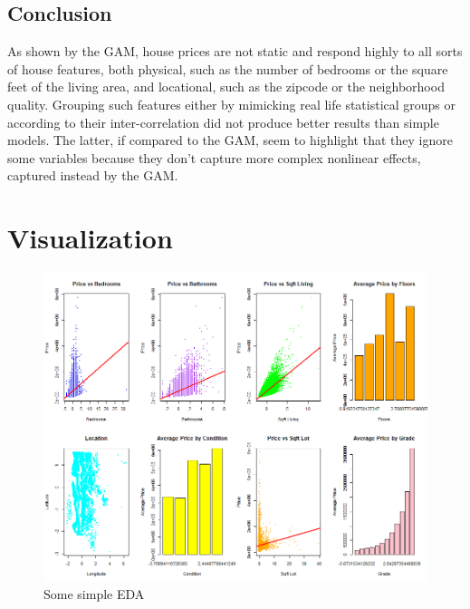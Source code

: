 \documentclass[a4paper, 11pt]{article}
\begin{document}
\begin{multicols}{2}
\section{Conclusion} \vspace{-7pt}
\noindent
As shown by the GAM, house prices are not static and respond highly to all sorts of house features, both physical, such as the number of bedrooms or the square feet of the living area, and locational, such as the zipcode or the neighborhood quality. Grouping such features either by mimicking real life statistical groups or according to their inter-correlation did not produce better results than simple models. The latter, if compared to the GAM, seem to highlight that they ignore some variables because they don't capture more complex nonlinear effects, captured instead by the GAM. 
\end{multicols}


\pagebreak
\appendix

\section{Visualization}
 \vspace{7pt}

\begin{figure}[H]
\includegraphics[scale=0.65]{eda}
\centering
\caption{Some simple EDA}
\label{fig:eda}
\end{figure}
\end{document}
